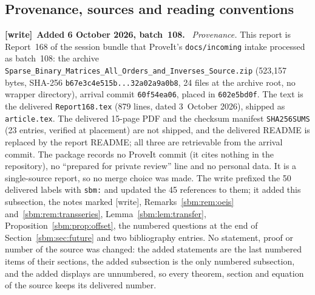 \documentclass[11pt,letterpaper]{article}
\numberwithin{equation}{section}
\theoremstyle{remark}\newtheorem{remark}[theorem]{Remark}
\newcommand{\file}[1]{\nolinkurl{#1}}
\newenvironment{writenote}[1][]{\par\smallskip\begingroup\small
 \noindent\textbf{[write]}\if\relax\detokenize{#1}\relax\else~\textbf{#1.}\fi\ }%
 {\par\endgroup\smallskip}
\begin{document}
\subsection{Provenance, sources and reading conventions}\label{sbm:sec:provenance}
\begin{writenote}[Added 6 October 2026, batch~108]
\emph{Provenance.} This report is Report~168 of the session bundle that
ProveIt's \file{docs/incoming} intake processed as batch~108: the archive
\file{Sparse_Binary_Matrices_All_Orders_and_Inverses_Source.zip}
(523{,}157 bytes, SHA-256 \file{b67e3c4e515b...32a02a9a0b8}, 24 files at the
archive root, no wrapper directory), arrival commit \file{60f54ea06}, placed
in \file{602e5bd0f}. The text is the delivered \file{Report168.tex} (879
lines, dated 3~October 2026), shipped as \file{article.tex}. The delivered
15-page PDF and the checksum manifest \file{SHA256SUMS} (23 entries,
verified at placement) are not shipped, and the delivered README is replaced
by the report README; all three are retrievable from the arrival commit. The
package records no ProveIt commit (it cites nothing in the repository), no
``prepared for private review'' line and no personal data. It is a
single-source report, so no merge choice was made. The write prefixed the
50 delivered labels with \file{sbm:} and updated the 45 references to them;
it added this subsection, the notes marked [write],
Remarks~\ref{sbm:rem:oeis} and~\ref{sbm:rem:transseries},
Lemma~\ref{sbm:lem:transfer}, Proposition~\ref{sbm:prop:offset}, the
numbered questions at the end of Section~\ref{sbm:sec:future} and two
bibliography entries. No statement, proof or number of the source was
changed: the added statements are the last numbered items of their
sections, the added subsection is the only numbered subsection, and the
added displays are unnumbered, so every theorem, section and equation of the
source keeps its delivered number.


\end{writenote}
\end{document}
